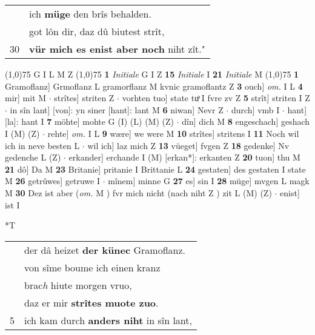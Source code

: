 \documentclass[8pt,a4paper,notitlepage]{article}
\begin{document}
\begin{table}[ht]
\begin{minipage}[t]{0.5\linewidth}
\begin{tabular}{rl}
 & ich \textbf{müge} den brîs behalden.\\ 
 & got lôn dir, daz dû biutest strît,\\ 
30 & \textbf{vür mich es enist aber noch} niht zît."\\ 
\end{tabular}
\scriptsize
\line(1,0){75} \newline
G I L M Z \newline
\line(1,0){75} \newline
\textbf{1} \textit{Initiale} G I Z  \textbf{15} \textit{Initiale} I  \textbf{21} \textit{Initiale} M  \newline
\line(1,0){75} \newline
\textbf{1} Gramoflanz] Grmoflanz L gramorflanz M kvnic gramoflantz Z \textbf{3} ouch] \textit{om.} I L \textbf{4} mir] mit M  $\cdot$ strîtes] striten Z  $\cdot$ vorhten tuo] state tuͦ I fvre zv Z \textbf{5} strît] striten I Z  $\cdot$ in sîn lant] [von]: yn siner [hant]: lant M \textbf{6} niwan] Nevr Z  $\cdot$ durch] vmb I  $\cdot$ hant] [la]: hant I \textbf{7} möhte] mohte G (I) (L) (M) (Z)  $\cdot$ dîn] dich M \textbf{8} engeschach] geshach I (M) (Z)  $\cdot$ rehte] \textit{om.} I L \textbf{9} wære] we were M \textbf{10} strîtes] stritens I \textbf{11} Noch wil ich in neve besten L  $\cdot$ wil ich] laz mich Z \textbf{13} vüeget] fvgen Z \textbf{18} gedenke] Nv gedenche L (Z)  $\cdot$ erkander] erchande I (M) [erkan*]: erkanten  Z \textbf{20} tuon] thu M \textbf{21} dô] Da M \textbf{23} Britanie] pritanie I Brittanie L \textbf{24} gestaten] des gestaten I state M \textbf{26} getrûwes] getruwe I  $\cdot$ mînem] minne G \textbf{27} es] sin I \textbf{28} müge] mvgen L magk M \textbf{30} Dez ist aber (\textit{om.} M ) fvr mich nicht (nach niht Z ) zit L (M) (Z)  $\cdot$ enist] ist I \newline
\end{minipage}
\hspace{0.5cm}
\begin{minipage}[t]{0.5\linewidth}
\small
\begin{center}*T
\end{center}
\begin{tabular}{rl}
 & der dâ heizet \textbf{der künec} Gramoflanz.\\ 
 & von sîme boume ich einen kranz\\ 
 & brac\textit{h} hiute morgen vruo,\\ 
 & daz er mir \textbf{strîtes muote zuo}.\\ 
5 & ich kam durch \textbf{anders niht} in sîn lant,\\ 

\end{tabular}
\end{minipage}
\end{table}
\end{document}
